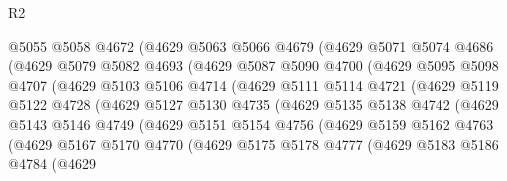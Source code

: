 \begin{lexlean}{R2}
\begin{coremodule}
                @5055
                @5058
                @4672
                (@4629
                  @5063
                  @5066
                  @4679
                  (@4629
                    @5071
                    @5074
                    @4686
                    (@4629
                      @5079
                      @5082
                      @4693
                      (@4629
                        @5087
                        @5090
                        @4700
                        (@4629
                          @5095
                          @5098
                          @4707
                          (@4629
                            @5103
                            @5106
                            @4714
                            (@4629
                              @5111
                              @5114
                              @4721
                              (@4629
                                @5119
                                @5122
                                @4728
                                (@4629
                                  @5127
                                  @5130
                                  @4735
                                  (@4629
                                    @5135
                                    @5138
                                    @4742
                                    (@4629
                                      @5143
                                      @5146
                                      @4749
                                      (@4629
                                        @5151
                                        @5154
                                        @4756
                                        (@4629
                                          @5159
                                          @5162
                                          @4763
                                          (@4629
                                            @5167
                                            @5170
                                            @4770
                                            (@4629
                                              @5175
                                              @5178
                                              @4777
                                              (@4629
                                                @5183
                                                @5186
                                                @4784
                                                (@4629

\end{coremodule}
\end{lexlean}

